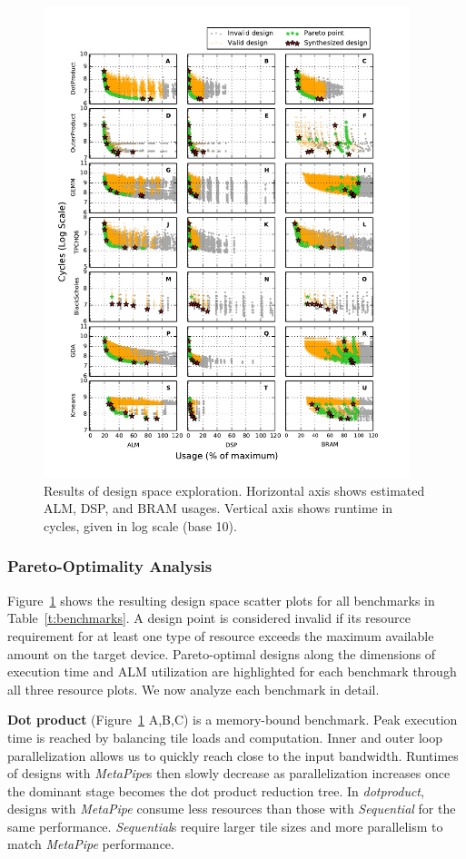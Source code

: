 \begin{figure}[!htbp]
\centering
\includegraphics[width=0.95\textwidth]{figs/tradeoff.pdf}
\caption{Results of design space exploration. Horizontal axis shows estimated ALM, DSP, and BRAM usages. Vertical axis shows runtime in cycles, given in log scale (base 10).}
\label{fig:dse}
\end{figure}

\subsubsection{Pareto-Optimality Analysis}
Figure~\ref{fig:dse} shows the resulting design space scatter plots for all benchmarks in
Table~\ref{t:benchmarks}. A design point is considered
invalid if its resource requirement for at least one type of resource exceeds the maximum
available amount on the target device. Pareto-optimal designs along the dimensions of execution time
and ALM utilization are highlighted for each benchmark through all three resource plots.
We now analyze each benchmark in detail.

\textbf{Dot product} (Figure~\ref{fig:dse} A,B,C) is a memory-bound benchmark. Peak execution
time is reached by balancing tile loads and computation. Inner and outer loop parallelization allows us to
quickly reach close to the input bandwidth. Runtimes of designs with \emph{MetaPipe}s then slowly decrease as parallelization
increases once the dominant stage becomes the dot product reduction tree. In \emph{dotproduct}, designs with \emph{MetaPipe} consume less resources than those with \emph{Sequential} for the same performance. \emph{Sequential}s require larger tile sizes and more parallelism to match \emph{MetaPipe} performance.

